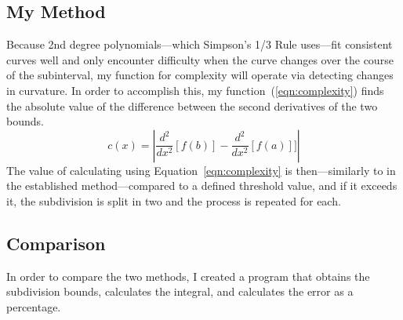 \documentclass{paper}
\newcommand{\sder}[1]{\dfrac{d^2}{dx^2}\left[#1\right]}
\begin{document}
\subsection{My Method}
Because 2nd degree polynomials---which Simpson's 1/3 Rule uses---fit consistent curves well and only encounter difficulty when the curve changes over the course of the subinterval, my function for complexity will operate via detecting changes in curvature.
In order to accomplish this, my function~(\ref{eqn:complexity}) finds the absolute value of the difference between the second derivatives of the two bounds.
%
\begin{equation}
    \label{eqn:complexity}
    c(x) = \left|\sder{f(b)} - \sder{f(a)}]\right|
\end{equation}
%
The value of calculating using Equation~\ref{eqn:complexity} is then---similarly to in the established method---compared to a defined threshold value, and if it exceeds it, the subdivision is split in two and the process is repeated for each.

\subsection{Comparison}
In order to compare the two methods, I created a program that obtains the subdivision bounds, calculates the integral, and calculates the error as a percentage.
%




%
\end{document}
